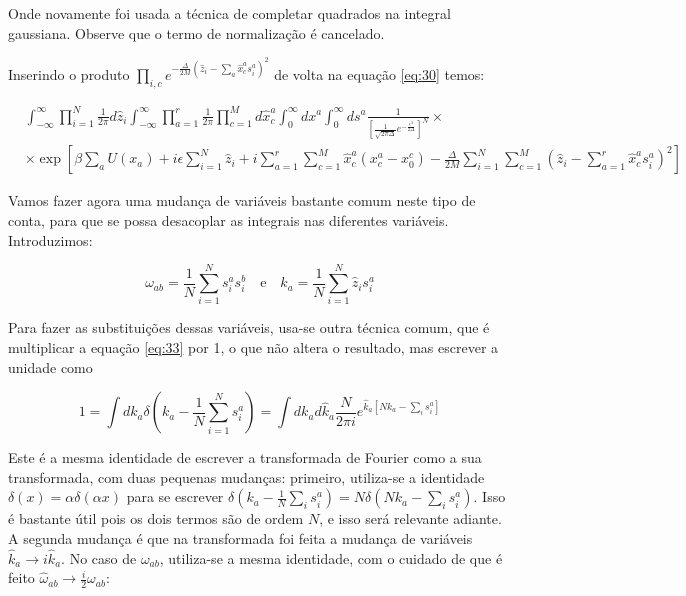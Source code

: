 Onde novamente foi usada a técnica de completar quadrados na integral
gaussiana. Observe que o termo de normalização é cancelado.

Inserindo o produto $\prod_{i,c} e^{-\frac{\Delta}{2M} \left(\hat{z}_i
    - \sum_a \hat{x}_c^a s_i^a\right)^2}$ de volta na equação
\eqref{eq:30} temos:

\begin{align}
  \label{eq:33}
  & \int_{-\infty}^\infty \prod_{i=1}^N 
  \frac{1}{2\pi} d\hat{z}_i \int_{-\infty}^\infty \prod_{a=1}^r
  \frac{1}{2\pi} \prod_{c=1}^M d\hat{x}_c^a \int_0^{\infty} d x^a
  \int_0^\infty ds^a \frac{1}{\left[\frac{1}{\sqrt{2\pi\Delta}}
      e^{-\frac{\epsilon^2}{2\Delta}}\right]^N}  \times \\ 
  & \times \exp\left[\beta \sum_a U(x_a) + i\epsilon\sum_{i=1}^N \hat{z}_i + i\sum_{a=1}^r \sum_{c=1}^M
    \hat{x}_c^a \left(x_c^a - x_0^c\right) -
    \frac{\Delta}{2M}\sum_{i=1}^N \sum_{c=1}^M\left(\hat{z}_i -
      \sum_{a=1}^r \hat{x}_c^a s_i^a \right)^2\right]
\end{align}

Vamos fazer agora uma mudança de variáveis bastante comum neste tipo
de conta, para que se possa desacoplar as integrais nas diferentes
variáveis. Introduzimos:

\begin{equation}
  \label{eq:36}
  \omega_{ab} = \frac{1}{N} \sum_{i=1}^N s_i^a s_i^b \quad \text{e}
  \quad k_a = \frac{1}{N} \sum_{i=1}^N \hat{z}_i s_i^a
\end{equation}

Para fazer as substituições dessas variáveis, usa-se outra técnica
comum, que é multiplicar a equação \eqref{eq:33} por 1, o que não
altera o resultado, mas escrever a unidade como

\begin{equation}
  \label{eq:k}
  1 = \int dk_{a} \delta\left(k_a -
    \frac{1}{N}\sum_{i=1}^N s_i^a\right) = \int dk_a
  d\hat{k}_a \frac{N}{2\pi i} e^{\hat{k}_{a} [N k_a - \sum_i
      s_i^a]}  
\end{equation}

Este é a mesma identidade de escrever a transformada de Fourier como a
sua transformada, com duas pequenas mudanças: primeiro, utiliza-se a
identidade $\delta(x) = \alpha \delta(\alpha x)$ para se escrever
$\delta(k_a - \frac{1}{N} \sum_i s_i^a) = N \delta(N k_a - \sum_i
s_i^a)$. Isso é bastante útil pois os dois termos são de ordem $N$, e
isso será relevante adiante. A segunda mudança é que na transformada
foi feita a mudança de variáveis $\hat{k}_a \to i\hat{k}_a$. No caso
de $\omega_{ab}$, utiliza-se a mesma identidade, com o cuidado de que
é feito $\hat{\omega}_{ab} \to \frac{i}{2} \omega_{ab}$:

